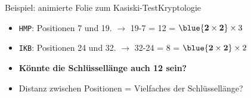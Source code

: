 \begin{frame}[fragile]{Beispiel: animierte Folie zum Kasiski-Test}{Kryptologie}
\begin{itemize}
          \begin{itemize}
            \item<6-> \texttt{HMP}: Positionen 7 und 19. $\rightarrow$ 19-7 = 12 = $\blue{\mathbf{2\times 2}} \times 3$
            \item<7-> \texttt{IKB}: Positionen 24 und 32. $\rightarrow$ 32-24 = 8  = $\blue{\mathbf{2\times 2}}\times 2$
            \item<8-> \textbf{Könnte die Schlüssellänge auch 12 sein?} 
            \item<11-> Distanz zwischen Positionen = Vielfaches der Schlüssellänge?
          \end{itemize}
  \end{itemize}
\end{frame}

